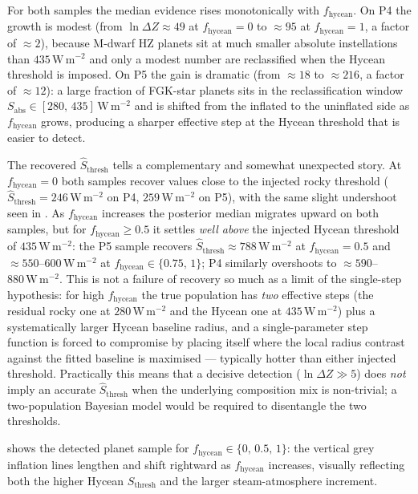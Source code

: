 For both samples the median evidence rises monotonically with
$f_\mathrm{hycean}$.  On P4 the growth is modest (from
$\ln\Delta Z \approx 49$ at $f_\mathrm{hycean}=0$ to $\approx 95$ at
$f_\mathrm{hycean}=1$, a factor of $\approx 2$), because M-dwarf HZ
planets sit at much smaller absolute instellations than $435\,\mathrm{W\,m^{-2}}$
and only a modest number are reclassified when the Hycean threshold is
imposed.  On P5 the gain is dramatic (from $\approx 18$ to $\approx 216$,
a factor of $\approx 12$): a large fraction of FGK-star planets sits in
the reclassification window $S_\mathrm{abs}\in[280,\,435]\,\mathrm{W\,m^{-2}}$
and is shifted from the inflated to the uninflated side as
$f_\mathrm{hycean}$ grows, producing a sharper effective step at the
Hycean threshold that is easier to detect.

The recovered $\hat{S}_\mathrm{thresh}$ tells a complementary and
somewhat unexpected story.  At $f_\mathrm{hycean}=0$ both samples
recover values close to the injected rocky threshold
($\hat{S}_\mathrm{thresh}=246\,\mathrm{W\,m^{-2}}$ on P4,
$259\,\mathrm{W\,m^{-2}}$ on P5), with the same slight undershoot
seen in .  As $f_\mathrm{hycean}$ increases the
posterior median migrates upward on both samples, but for
$f_\mathrm{hycean}\geq 0.5$ it settles \emph{well above} the injected
Hycean threshold of $435\,\mathrm{W\,m^{-2}}$: the P5 sample recovers
$\hat{S}_\mathrm{thresh}\approx 788\,\mathrm{W\,m^{-2}}$ at
$f_\mathrm{hycean}=0.5$ and $\approx 550$--$600\,\mathrm{W\,m^{-2}}$
at $f_\mathrm{hycean}\in\{0.75,\,1\}$; P4 similarly overshoots to
$\approx 590$--$880\,\mathrm{W\,m^{-2}}$.  This is not a failure of
recovery so much as a limit of the single-step hypothesis: for high
$f_\mathrm{hycean}$ the true population has \emph{two} effective steps
(the residual rocky one at $280\,\mathrm{W\,m^{-2}}$ and the Hycean one
at $435\,\mathrm{W\,m^{-2}}$) plus a systematically larger Hycean
baseline radius, and a single-parameter step function is forced to
compromise by placing itself where the local radius contrast against
the fitted baseline is maximised — typically hotter than either
injected threshold.  Practically this means that a decisive detection
($\ln\Delta Z \gg 5$) does \emph{not} imply an accurate
$\hat{S}_\mathrm{thresh}$ when the underlying composition mix is
non-trivial; a two-population Bayesian model would be required to
disentangle the two thresholds.

 shows the detected planet
sample for $f_\mathrm{hycean} \in \{0,\,0.5,\,1\}$: the vertical grey
inflation lines lengthen and shift rightward as $f_\mathrm{hycean}$
increases, visually reflecting both the higher Hycean
$S_\mathrm{thresh}$ and the larger steam-atmosphere increment.

